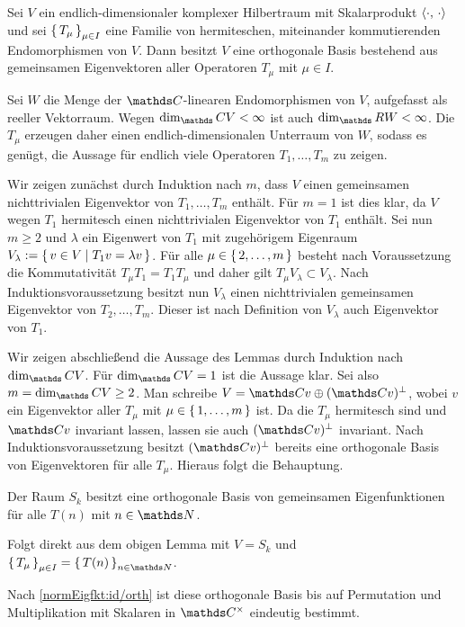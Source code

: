 \begin{lemm}
Sei $V$ ein endlich-dimensionaler komplexer Hilbertraum mit Skalarprodukt $\scalarprd \cdot \cdot$ und sei $\left\{\,T_\mu\,\right\}_{\mu \in I}$ eine Familie von hermiteschen, miteinander kommutierenden Endomorphismen von $V$. Dann besitzt $V$ eine orthogonale Basis bestehend aus gemeinsamen Eigenvektoren aller Operatoren $T_\mu$ mit $\mu \in I$. 
\end{lemm}

\begin{bewe}
Sei $W$ die Menge der $\CC$-linearen Endomorphismen von $V$, aufgefasst als reeller Vektorraum. Wegen $\dim_\CC V < \infty$ ist auch $\dim_\RR W < \infty$. Die $T_\mu$ erzeugen daher einen endlich-dimensionalen Unterraum von $W$, sodass es genügt, die Aussage für endlich viele Operatoren $T_1, \ldots, T_m$ zu zeigen.

Wir zeigen zunächst durch Induktion nach $m$, dass $V$ einen gemeinsamen nichttrivialen Eigenvektor von $T_1, \ldots, T_m$ enthält. Für $m = 1$ ist dies klar, da $V$ wegen $T_1$ hermitesch einen nichttrivialen Eigenvektor von $T_1$ enthält. Sei nun $m \geq 2$ und $\lambda$ ein Eigenwert von $T_1$ mit zugehörigem Eigenraum $V_\lambda := \left\{\,v \in V \mid T_1 v = \lambda v \,\right\}$. Für alle $\mu \in \left\{\,2, \ldots, m\,\right\}$ besteht nach Voraussetzung die Kommutativität $T_\mu T_1 = T_1 T_\mu$ und daher gilt $T_\mu V_\lambda \subset V_\lambda$. Nach Induktionsvoraussetzung besitzt nun $V_\lambda$ einen nichttrivialen gemeinsamen Eigenvektor von $T_2, \ldots, T_m$. Dieser ist nach Definition von $V_\lambda$ auch Eigenvektor von $T_1$.

Wir zeigen abschließend die Aussage des Lemmas durch Induktion nach $\dim_\CC V$. Für $\dim_\CC V = 1$ ist die Aussage klar. Sei also $m = \dim_\CC V \geq 2$. Man schreibe $V = \CC v \oplus (\CC v)^\bot$, wobei $v$ ein Eigenvektor aller $T_\mu$ mit $\mu \in \left\{\,1, \ldots, m\,\right\}$ ist. Da die $T_\mu$ hermitesch sind und $\CC v$ invariant lassen, lassen sie auch $(\CC v)^\bot$ invariant. Nach Induktionsvoraussetzung besitzt $(\CC v)^\bot$ bereits eine orthogonale Basis von Eigenvektoren für alle $T_\mu$. Hieraus folgt die Behauptung.
\end{bewe}

\begin{koro}
Der Raum $S_k$ besitzt eine orthogonale Basis von gemeinsamen Eigenfunktionen für alle $T(n)$ mit $n \in \NN$.
\end{koro}
\begin{bewe}
Folgt direkt aus dem obigen Lemma mit $V = S_k$ und $\Set {T_\mu}_{\mu \in I} = \Set {T(n)}_{n \in \NN}$.
\end{bewe}

\begin{beme}
Nach \autoref{normEigfkt:id/orth} ist diese orthogonale Basis bis auf Permutation und Multiplikation mit Skalaren in $\CC^\times$ eindeutig bestimmt.
\end{beme}
